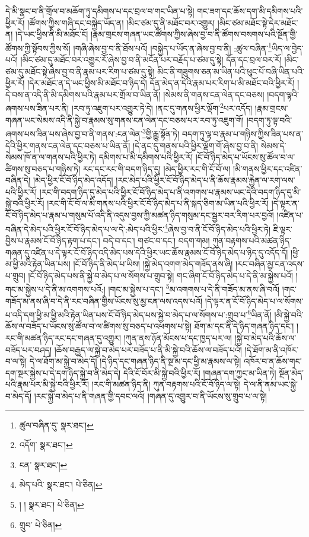 དེ་མི་སྣང་བ་ནི་གྲོལ་བ་མཆོག་ཏུ་དམིགས་པ་དང་བྲལ་བ་གང་ཡིན་པ་སྟེ། གང་ཟག་དང་ཆོས་དག་མི་དམིགས་པའི་ཕྱིར་རོ། །ཚོགས་ཀྱིས་གཞི་དང་བསྐྱེད་ཡོད་ན། །མིང་ཙམ་དུ་ནི་མཐོང་བར་འགྱུར། །མིང་ཙམ་མཐོང་སྟེ་དེར་མཐོང་ན། །དེ་ཡང་ཕྱིས་ནི་མི་མཐོང་ངོ། །རྣམ་གྲངས་གཞན་ཡང་ཚོགས་ཀྱིས་ཞེས་བྱ་བ་ནི་ཚོགས་བསགས་པའི་སྔོན་གྱི་ཚོགས་ཀྱི་སྟོབས་ཀྱིས་སོ། །གཞི་ཞེས་བྱ་བ་ནི་ཐོས་པའོ། །བསྐྱེད་པ་ཡོད་ན་ཞེས་བྱ་བ་ནི། :ཚུལ་བཞིན་\footnote{ཚུལ་བཞིན་དུ་  སྣར་ཐང་། }ཡིད་ལ་བྱེད་པའོ། །མིང་ཙམ་དུ་མཐོང་བར་འགྱུར་རོ་ཞེས་བྱ་བ་ནི་མངོན་པར་བརྗོད་པ་ཙམ་དུ་སྟེ། དོན་དང་བྲལ་བར་རོ། །མིང་ཙམ་དུ་མཐོང་སྟེ་ཞེས་བྱ་བ་ནི་རྣམ་པར་རིག་པ་ཙམ་དུ་སྟེ། མིང་ནི་གཟུགས་ཅན་མ་ཡིན་པའི་ཕུང་པོ་བཞི་ཡིན་པའི་ཕྱིར་རོ། །དེར་མཐོང་ན་དེ་ཡང་ཕྱིས་མི་མཐོང་བ་ཉིད་དེ། དོན་མེད་ན་དེའི་རྣམ་པར་རིག་པ་མི་མཐོང་བའི་ཕྱིར་རོ། །དེ་བས་ན་འདི་ནི་མི་དམིགས་པའི་རྣམ་པར་གྲོལ་བ་ཡིན་ནོ། །སེམས་ནི་གནས་ངན་ལེན་དང་བཅས། །བདག་ལྟའི་ཞགས་པས་ཟིན་པར་ནི། །རབ་ཏུ་འཇུག་པར་འགྱུར་ཏེ་དེ། །ནང་དུ་གནས་ཕྱིར་ལྡོག་\footnote{འདོག་  སྣར་ཐང་། }པར་འདོད། །རྣམ་གྲངས་གཞན་ཡང་སེམས་འདི་ནི་སྐྱེ་བ་རྣམས་སུ་གནས་ངན་ལེན་དང་བཅས་པར་རབ་ཏུ་འཇུག་གོ། །བདག་ཏུ་ལྟ་བའི་ཞགས་པས་ཟིན་པས་ཞེས་བྱ་བ་ནི་གནས་:ངན་ལེན་\footnote{ངན་  སྣར་ཐང་། }གྱི་རྒྱུ་སྟོན་ཏེ། བདག་ཏུ་ལྟ་བ་རྣམ་པ་གཉིས་ཀྱིས་ཟིན་པས་ན་དེའི་ཕྱིར་གནས་ངན་ལེན་དང་བཅས་པ་ཡིན་ནོ། །དེ་ནང་དུ་གནས་པའི་ཕྱིར་ལྡོག་གོ་ཞེས་བྱ་བ་ནི། སེམས་དེ་སེམས་ཁོ་ན་ལ་གནས་པའི་ཕྱིར་ཏེ། དམིགས་པ་མི་དམིགས་པའི་ཕྱིར་རོ། །ངོ་བོ་ཉིད་མེད་པ་ཡོངས་སུ་ཚོལ་བ་ལ་ཚིགས་སུ་བཅད་པ་གཉིས་ཏེ། རང་དང་རང་གི་བདག་ཉིད་དུ། །མེད་ཕྱིར་རང་གི་ངོ་བོ་ལ། །མི་གནས་ཕྱིར་དང་འཛིན་བཞིན་དེ། །མེད་ཕྱིར་ངོ་བོ་ཉིད་མེད་འདོད། །རང་མེད་པའི་ཕྱིར་ངོ་བོ་ཉིད་མེད་པ་ནི་ཆོས་རྣམས་རྐྱེན་ལ་རག་ལས་པའི་ཕྱིར་རོ། །རང་གི་བདག་ཉིད་དུ་མེད་པའི་ཕྱིར་ངོ་བོ་ཉིད་མེད་པ་ནི་འགགས་པ་རྣམས་ཡང་དེའི་བདག་ཉིད་དུ་མི་སྐྱེ་བའི་ཕྱིར་རོ། །རང་གི་ངོ་བོ་ལ་མི་གནས་པའི་ཕྱིར་ངོ་བོ་ཉིད་མེད་པ་ནི་སྐད་ཅིག་མ་ཡིན་པའི་ཕྱིར་རོ། །དེ་ལྟར་ན་ངོ་བོ་ཉིད་མེད་པ་རྣམ་པ་གསུམ་པོ་འདི་ནི་འདུས་བྱས་ཀྱི་མཚན་ཉིད་གསུམ་དང་སྦྱར་བར་རིག་པར་བྱའོ། །འཛིན་པ་བཞིན་དེ་མེད་པའི་ཕྱིར་ངོ་བོ་ཉིད་མེད་པ་ལ་དེ་:མེད་པའི་ཕྱིར་\footnote{མེད་པའི་  སྣར་ཐང་།  པེ་ཅིན། }ཞེས་བྱ་བ་ནི་ངོ་བོ་ཉིད་མེད་པའི་ཕྱིར་ཏེ། ཇི་ལྟར་བྱིས་པ་རྣམས་ངོ་བོ་ཉིད་རྟག་པ་དང་། བདེ་བ་དང་། གཙང་བ་དང་། བདག་གམ། ཀུན་བརྟགས་པའི་མཚན་ཉིད་གཞན་དུ་འཛིན་པ་དེ་ལྟར་ངོ་བོ་ཉིད་འདི་མེད་པས་དེའི་ཕྱིར་ཡང་ཆོས་རྣམས་ངོ་བོ་ཉིད་མེད་པ་ཉིད་དུ་འདོད་དོ། །ཕྱི་མ་ཕྱི་མའི་རྟེན་ཡིན་པས། །ངོ་བོ་ཉིད་ནི་མེད་པ་ཡིས། །སྐྱེ་མེད་འགག་མེད་གཟོད་ནས་ཞི། །རང་བཞིན་མྱ་ངན་འདས་པ་གྲུབ། །ངོ་བོ་ཉིད་མེད་པས་ནི་སྐྱེ་བ་མེད་པ་ལ་སོགས་པ་གྲུབ་སྟེ། གང་ཞིག་ངོ་བོ་ཉིད་མེད་པ་དེ་ནི་མ་སྐྱེས་པའོ། །གང་མ་སྐྱེས་པ་དེ་ནི་མ་འགགས་པའོ:། །གང་མ་སྐྱེས་པ་དང་། \footnote{། །   སྣར་ཐང་།  པེ་ཅིན། }མ་འགགས་པ་དེ་ནི་གཟོད་མ་ནས་ཞི་བའོ། །གང་གཟོད་མ་ནས་ཞི་བ་དེ་ནི་རང་བཞིན་གྱིས་ཡོངས་སུ་མྱ་ངན་ལས་འདས་པའོ། །དེ་ལྟར་ན་ངོ་བོ་ཉིད་མེད་པ་ལ་སོགས་པ་འདི་དག་ཕྱི་མ་ཕྱི་མའི་རྟེན་ཡིན་པས་ངོ་བོ་ཉིད་མེད་པས་སྐྱེ་བ་མེད་པ་ལ་སོགས་པ་:གྲུབ་པ་\footnote{གྲུབ་  པེ་ཅིན། }ཡིན་ནོ། །མི་སྐྱེ་བའི་ཆོས་ལ་བཟོད་པ་ཡོངས་སུ་ཚོལ་བ་ལ་ཚིགས་སུ་བཅད་པ་འཕགས་པ་སྟེ། ཐོག་མ་དང་ནི་དེ་ཉིད་གཞན་ཉིད་དང་། །རང་གི་མཚན་ཉིད་རང་དང་གཞན་དུ་འགྱུར། །ཀུན་ནས་ཉོན་མོངས་པ་དང་ཁྱད་པར་ལ། །སྐྱེ་བ་མེད་པའི་ཆོས་ལ་བཟོད་པར་བཤད། །ཆོས་བརྒྱད་ལ་སྐྱེ་བ་མེད་པར་བཟོད་པ་ནི་མི་སྐྱེ་བའི་ཆོས་ལ་བཟོད་པའོ། །དེ་ཐོག་མ་ནི་འཁོར་བ་ལ་སྟེ། དེ་ལ་ཐོག་མ་སྐྱེ་བ་མེད་དོ། །དེ་ཉིད་དང་གཞན་ཉིད་ནི་སྔ་མ་དང་ཕྱི་མ་རྣམས་ལ་སྟེ། འཁོར་བ་ན་ཆོས་གང་དག་སྔར་སྐྱེས་པ་དེ་དག་ཉིད་སྐྱེ་བ་ནི་མེད་དེ། དེའི་ངོ་བོར་མི་སྐྱེ་བའི་ཕྱིར་རོ། །གཞན་དག་ཀྱང་མ་ཡིན་ཏེ། སྔོན་མེད་པའི་རྣམ་པར་མི་སྐྱེ་བའི་ཕྱིར་རོ། །རང་གི་མཚན་ཉིད་ནི། ཀུན་བརྟགས་པའི་ངོ་བོ་ཉིད་ལ་སྟེ། དེ་ལ་ནི་ནམ་ཡང་སྐྱེ་བ་མེད་དོ། །རང་སྐྱེ་བ་མེད་པ་ནི་གཞན་གྱི་དབང་ལའོ། །གཞན་དུ་འགྱུར་བ་ནི་ཡོངས་སུ་གྲུབ་པ་ལ་སྟེ། 